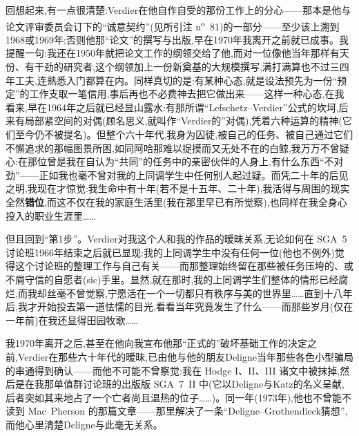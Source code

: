 回想起来,有一点很清楚:Verdier在他自作自受的那份工作上的分心——那本是他与论文评审委员会订下的“诚意契约”(见所引注 n\textsuperscript{o}~81)的一部分——至少该上溯到1968或1969年;否则他那“论文”的撰写与出版,早在1970年我离开之前就已成事。我提醒一句:我还在1950年就把论文工作的纲领交给了他,而对一位像他当年那样有天份、有干劲的研究者,这个纲领加上一份新奠基的大规模撰写,满打满算也不过三四年工夫,连熟悉入门都算在内。同样真切的是:有某种心态,就是设法预先为一份“预定”的工作支取一笔信用,事后再也不必费神去把它做出来——这样一种心态,在我看来,早在1964年之后就已经显山露水:有那所谓“Lefschetz--Verdier”公式的坎坷,后来有局部紧空间的对偶(顾名思义,就叫作“Verdier的”对偶),凭着六种运算的精神\dmark{}(它们至今仍不被提名)。但整个六十年代,我身为囚徒,被自己的任务、被自己通过它们不懈追求的那幅图景所困,如同阿哈那难以捉摸而又无处不在的白鲸,我万万不曾疑心:在那位曾是我在自认为“共同”的任务中的亲密伙伴的人身上,有什么东西“不对劲”——正如我也毫不曾对我的上同调学生中任何别人起过疑。而凭二十年的后见之明,我现在才惊觉:我生命中有十年(若不是十五年、二十年),我活得与周围的现实全然\textbf{错位},而这不仅在我的家庭生活里(我在那里早已有所觉察),也同样在我全身心投入的职业生涯里……

但且回到“第1步”。Verdier对我这个人和我的作品的暧昧关系,无论如何在 SGA~5 讨论班1966年结束之后就已显现:我的上同调学生中没有任何一位(他也不例外)觉得这个讨论班的整理工作与自己有关——而那整理始终留在那些被任务压垮的、或不屑守信的自愿者(sic)手里。显然,就在那时,我的上同调学生们整体的情形已经腐烂,而我却丝毫不曾觉察,宁愿活在一个一切都只有秩序与美的世界里……直到十八年后,我才开始投去第一道怯懦的目光,看看当年究竟发生了什么——而那些岁月(仅在一年前)在我还显得田园牧歌……

我1970年离开之后,甚至在他向我宣布他那“正式的”破坏基础工作的决定之前,Verdier在那些六十年代的暧昧,已由他与他的朋友Deligne当年那些各色小型骗局的串通得到确认——而他不可能不曾察觉:\dmark{}我在 Hodge I、II、III 诸文中被抹掉,然后是在我那单值群讨论班的出版版 SGA~7~II 中(它以Deligne与Katz的名义呈献,后者突如其来地占了一个亡者尚且温热的位子……)。同一年(1973年),他也不曾能不读到 Mac~Pherson 的那篇文章——那里解决了一条“Deligne--Grothendieck猜想”,而他心里清楚Deligne与此毫无关系。

